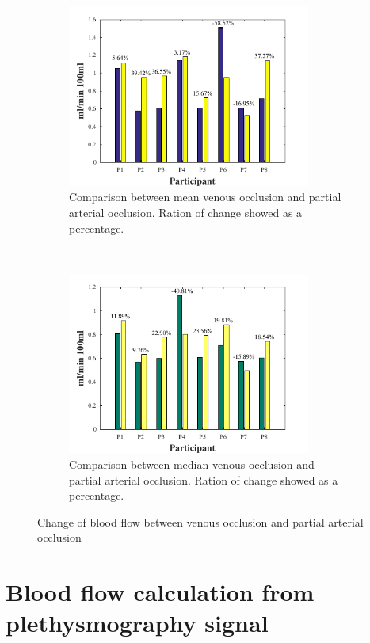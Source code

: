 \begin{figure}[t!]
	\centering
	\begin{subfigure}[t]{0.5\textwidth}
		\centering
		\includegraphics[height=6cm,keepaspectratio]{figure14a}    
		\caption{Comparison between mean venous occlusion and partial arterial occlusion. Ration of change showed as a percentage.}
		\label{fig:change_flow_mean}
	\end{subfigure}%
	~ 
	\begin{subfigure}[t]{0.5\textwidth}
		\centering
		\includegraphics[height=6cm,keepaspectratio,keepaspectratio]{figure14b}    
		\caption{Comparison between median venous occlusion and partial arterial occlusion. Ration of change showed as a percentage.}
		\label{fig:change_flow_median}
	\end{subfigure}
	\caption{Change of blood flow between venous occlusion and partial arterial occlusion}
	\label{fig:iPG_flow_comparative}
\end{figure}


\section{Blood flow calculation from plethysmography signal}
\label{section5.5}


